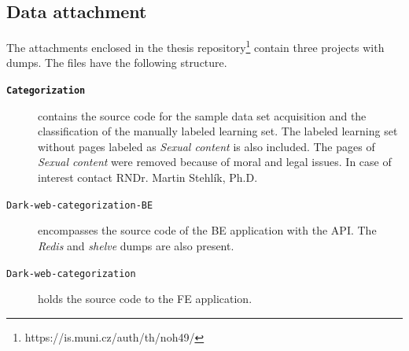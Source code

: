 \begin{appendices}
\chapter{Data attachment}
The attachments enclosed in the thesis repository\footnote{https://is.muni.cz/auth/th/noh49/} contain three projects with dumps. The files have the following structure.
\begin{description}
    \item[\textbf{\texttt{Categorization}}] contains the source code for the sample data set acquisition and the classification of the manually labeled learning set. The labeled learning set without pages labeled as \textit{Sexual content} is also included. The pages of \textit{Sexual content} were removed because of moral and legal issues. In case of interest contact RNDr. Martin Stehlík, Ph.D. 
    \item [\texttt{Dark-web-categorization-BE}] encompasses the source code of the BE application with the API. The \textit{Redis} and \textit{shelve} dumps are also present.
    \item [\texttt{Dark-web-categorization}] holds the source code to the FE application. 
\end{description}




\end{appendices}
